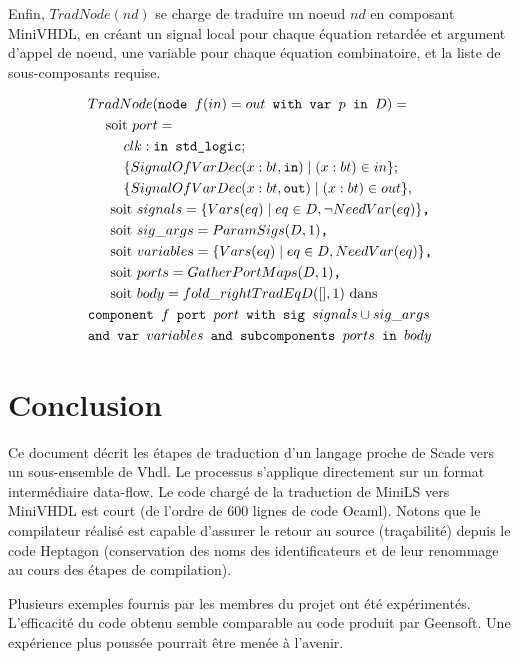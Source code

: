 \documentclass[a4paper]{article}
\newcommand{\LANG}{{\sc Heptagon}}
\newcommand{\scade}{{\sc Scade}}
\newcommand{\minils}{{\sc MiniLS}}
\newcommand{\minivhdl}{{\sc MiniVHDL}}
\newcommand{\vhdl}{{\sc Vhdl}}
\newcommand{\p}[0]{\; \vert \;}
\newcommand{\mybox}[1]{\mbox{\tt{#1}}}
\newcommand{\bl}[0]{\hspace{0.45cm}}
\begin{document}
Enfin, $TradNode(nd)$ se charge de traduire un noeud $nd$ en composant MiniVHDL, en
cr\'eant un signal local pour chaque \'equation retard\'ee et argument d'appel de
noeud, une variable pour chaque \'equation combinatoire, et la liste de
sous-composants requise.

\begin{align*}
  & TradNode(\mybox{node } f(in) = out \mybox{ with var } p \mybox{ in } D) = \\
  & \bl \mbox{soit } port = \\
  & \bl \bl clk : \mybox{in std\_logic}; \\
  & \bl \bl \{ SignalOfVarDec(x : bt, \mybox{in}) \p (x : bt) \in in \}; \\
  & \bl \bl \{ SignalOfVarDec(x : bt, \mybox{out}) \p (x : bt) \in out \}, \\
  & \bl \mbox{ soit } signals = \{ \V{eq} \p eq \in D, \neg \NV{eq} \}
  \mybox{,} \\
  & \bl \mbox{ soit } sig\_args = \PS{D}{1} \mybox{,} \\
  & \bl \mbox{ soit } variables = \{ \V{eq} \p eq \in D, \NV{eq} \} \mybox{,} \\
  & \bl \mbox{ soit } ports = \GPM{D}{1} \mybox{,} \\
  & \bl \mbox{ soit } body = fold\_right TradEq D ([], 1) \mbox{ dans} \\
  & \mybox{component } f \mybox{ port } port \mybox{ with sig } signals \cup
  sig\_args \\
  & \mybox{and var } variables \mybox{ and subcomponents } ports \mybox{ in }
  body
\end{align*}

\section{Conclusion}

Ce document d\'ecrit les \'etapes de traduction d'un langage proche de
\scade{} vers un sous-ensemble de \vhdl. Le processus s'applique
directement sur un format interm\'ediaire data-flow. Le code charg\'e de la traduction
de \minils{} vers \minivhdl{} est court (de l'ordre de 600 lignes de code Ocaml).
Notons que le compilateur r\'ealis\'e est capable d'assurer le retour au source (tra\c{c}abilit\'e)
depuis le code \LANG{} (conservation des noms des identificateurs et de leur renommage
au cours des \'etapes de compilation).

Plusieurs exemples fournis par les membres du projet ont \'et\'e exp\'eriment\'es. L'efficacit\'e
du code obtenu semble comparable au code produit par Geensoft. Une exp\'erience plus
pouss\'ee pourrait \^etre men\'ee \`a l'avenir. 
\end{document}
